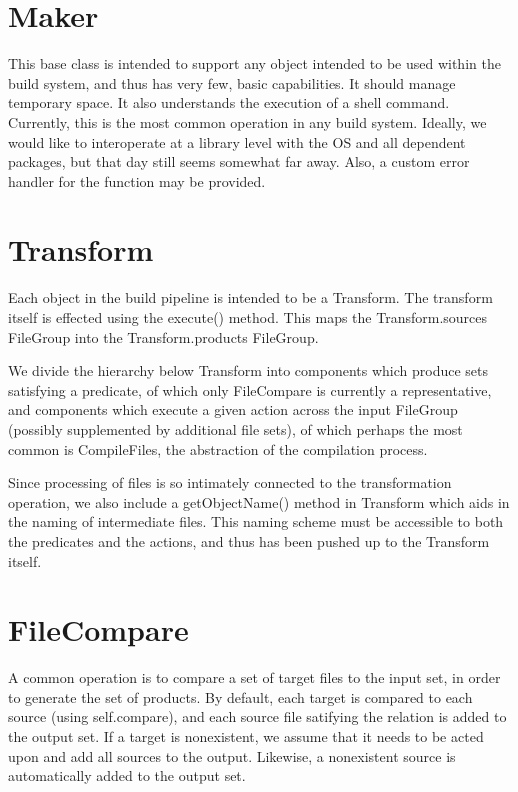 \section{Maker}

This base class is intended to support any object intended to be used within the build system, and thus has very few,
basic capabilities. It should manage temporary space. It also understands the execution of a shell command. Currently,
this is the most common operation in any build system. Ideally, we would like to interoperate at a library level with
the OS and all dependent packages, but that day still seems somewhat far away. Also, a custom error handler for the
function may be provided.

\section{Transform}

Each object in the build pipeline is intended to be a Transform. The transform itself is effected using the execute()
method. This maps the Transform.sources FileGroup into the Transform.products FileGroup.

We divide the hierarchy below Transform into components which produce sets satisfying a predicate, of which only
FileCompare is currently a representative, and components which execute a given action across the input FileGroup
(possibly supplemented by additional file sets), of which perhaps the most common is CompileFiles, the abstraction of
the compilation process.

Since processing of files is so intimately connected to the transformation operation, we also include a getObjectName()
method in Transform which aids in the naming of intermediate files. This naming scheme must be accessible to both the
predicates and the actions, and thus has been pushed up to the Transform itself.

\section{FileCompare}

A common operation is to compare a set of target files to the input set, in order to generate the set of products. By
default, each target is compared to each source (using self.compare), and each source file satifying the relation is
added to the output set. If a target is nonexistent, we assume that it needs to be acted upon and add all sources to the
output. Likewise, a nonexistent source is automatically added to the output set.

